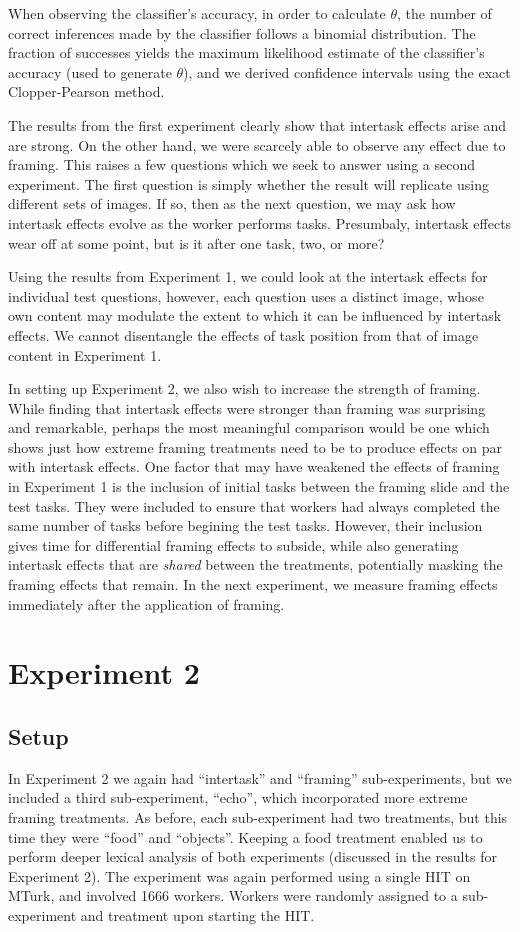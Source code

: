 \documentclass{sigchi}
\begin{document}
When observing the classifier's accuracy, in order to calculate $\theta$,
the number of correct inferences made by the classifier follows a binomial 
distribution.  The fraction of successes yields the maximum likelihood
estimate of the classifier's accuracy (used to generate $\theta$), 
and we derived confidence intervals using the exact Clopper-Pearson method.

The results from the first experiment clearly show that intertask effects 
arise and are strong.  On the other hand, we were scarcely able to observe
any effect due to framing.  This raises a few questions which we seek
to answer using a second experiment.  The first question is simply whether
the result will replicate using different sets of images.  
If so, then as the next question, we may ask how intertask effects evolve
as the worker performs tasks.  Presumbaly, intertask effects wear off at 
some point, but is it after one task, two, or more?  

Using the results from Experiment 1, 
we could look at the intertask effects for individual test questions, 
however, each question uses a distinct image, whose own content may
modulate the extent to which it can be influenced by intertask effects.
We cannot disentangle the effects of task position from that of image 
content in Experiment 1.

In setting up Experiment 2, we also wish to increase the strength of 
framing.  While finding that intertask effects were stronger than framing 
was surprising and remarkable, perhaps the most meaningful comparison
would be one which shows just how extreme framing treatments need to be 
to produce effects on par with intertask effects.  
One factor that may have weakened the effects of framing in Experiment 1 
is the inclusion of initial tasks between the framing slide and the test 
tasks. They were included to ensure that workers had always completed the
same number of tasks before begining the test tasks.  However, their 
inclusion gives time for differential framing effects to 
subside, while also generating intertask effects that are 
\textit{shared} between the treatments, potentially masking the framing 
effects that remain.  In the next experiment, we measure framing effects 
immediately after the application of framing.

\pagebreak
\section{Experiment 2}
\subsection{Setup}
In Experiment 2 we again had ``intertask'' and ``framing'' 
sub-experiments, but we included a third sub-experiment, ``echo'', which 
incorporated more extreme framing treatments.  
As before, each sub-experiment had
two treatments, but this time they were ``food'' and ``objects''.
Keeping a food treatment enabled us to perform deeper lexical analysis of 
both experiments (discussed in the results for Experiment 2).  
The experiment was again performed using a single HIT on MTurk, 
and involved 1666 workers.
Workers were randomly assigned to a sub-experiment and treatment upon
starting the HIT.
\end{document}
